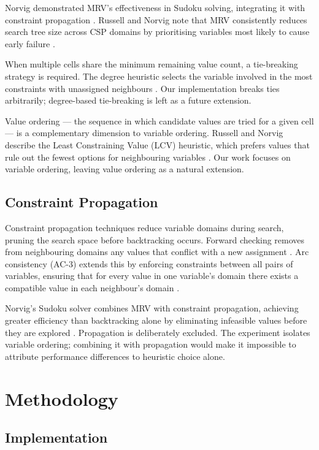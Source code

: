 \documentclass[conference]{IEEEtran}
\begin{document}
Norvig demonstrated MRV's effectiveness in Sudoku solving, integrating it with constraint propagation \cite{norvig2006}. Russell and Norvig note that MRV consistently reduces search tree size across CSP domains by prioritising variables most likely to cause early failure \cite{russell_norvig}.

When multiple cells share the minimum remaining value count, a tie-breaking strategy is required. The degree heuristic selects the variable involved in the most constraints with unassigned neighbours \cite{russell_norvig}. Our implementation breaks ties arbitrarily; degree-based tie-breaking is left as a future extension.

Value ordering — the sequence in which candidate values are tried for a given cell — is a complementary dimension to variable ordering. Russell and Norvig describe the Least Constraining Value (LCV) heuristic, which prefers values that rule out the fewest options for neighbouring variables \cite{russell_norvig}. Our work focuses on variable ordering, leaving value ordering as a natural extension.

\subsection{Constraint Propagation}

Constraint propagation techniques reduce variable domains during search, pruning the search space before backtracking occurs. Forward checking removes from neighbouring domains any values that conflict with a new assignment \cite{haralick1980}. Arc consistency (AC-3) extends this by enforcing constraints between all pairs of variables, ensuring that for every value in one variable's domain there exists a compatible value in each neighbour's domain \cite{mackworth1977}.

Norvig's Sudoku solver combines MRV with constraint propagation, achieving greater efficiency than backtracking alone by eliminating infeasible values before they are explored \cite{norvig2006}. Propagation is deliberately excluded. The experiment isolates variable ordering; combining it with propagation would make it impossible to attribute performance differences to heuristic choice alone.

\section{Methodology}

\subsection{Implementation}
\end{document}
